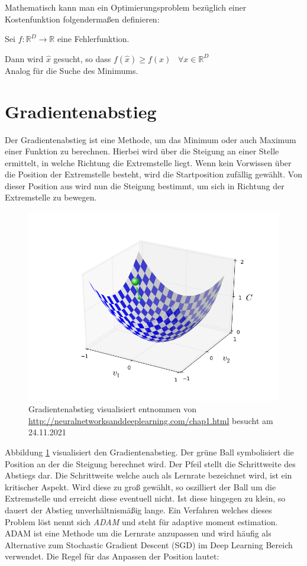 Mathematisch kann man ein Optimierungsproblem bezüglich einer Kostenfunktion folgendermaßen definieren:

Sei $f: \mathbb{R}^D\rightarrow \mathbb{R}$ eine Fehlerfunktion.

Dann wird $\hat{x}$ gesucht, so dass $f(\hat{x}) \geq f(x) \; \; \; \forall x \in \mathbb{R}^D$
\\
Analog für die Suche des Minimums.

\section{Gradientenabstieg}

Der Gradientenabstieg ist eine Methode, um das Minimum oder auch Maximum einer Funktion zu berechnen. Hierbei wird über die Steigung an einer Stelle ermittelt, in welche Richtung die Extremstelle liegt. Wenn kein Vorwissen über die Position 
der Extremstelle besteht, wird die Startposition zufällig gewählt. Von dieser Position aus wird nun die Steigung bestimmt, um sich in Richtung der Extremstelle zu bewegen.


\begin{figure}[H]
\centering
\includegraphics[width=0.8\linewidth]{figures/Grundlagen/valley_with_ball.png} 
\caption{Gradientenabstieg visualisiert \label{fig:GradVisual} entnommen von \url{http://neuralnetworksanddeeplearning.com/chap1.html} besucht am 24.11.2021}
\end{figure}

Abbildung \ref{fig:GradVisual} visualisiert den Gradientenabstieg. Der grüne Ball symbolisiert die Position an der die Steigung berechnet wird. Der Pfeil stellt die Schrittweite des Abstiegs dar. Die Schrittweite welche auch als Lernrate bezeichnet wird, ist ein kritischer Aspekt. Wird diese zu groß gewählt, so oszilliert der Ball um die Extremstelle und erreicht diese eventuell nicht. Ist diese hingegen zu klein, so dauert der Abstieg unverhältnismäßig lange. Ein Verfahren welches dieses Problem löst nennt sich \textit{ADAM} und steht für adaptive moment estimation.
ADAM ist eine Methode um die Lernrate anzupassen und wird häufig als Alternative zum Stochastic Gradient Descent (SGD) im Deep Learning Bereich verwendet.
Die Regel für das Anpassen der Position lautet:

